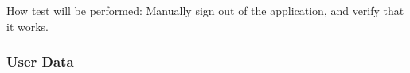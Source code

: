 \documentclass[12pt, titlepage]{article}
\begin{document}
\begin{enumerate}
How test will be performed: Manually sign out of the application, and verify that it works.



					
					
					



\end{enumerate}

\subsubsection{User Data}
\end{document}
